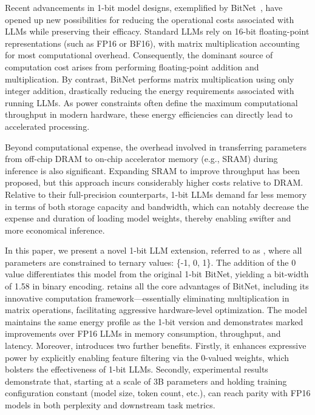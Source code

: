 Recent advancements in 1-bit model designs, exemplified by BitNet~\cite{bitnet}, have opened up new possibilities for reducing the operational costs associated with LLMs while preserving their efficacy. Standard LLMs rely on 16-bit floating-point representations (such as FP16 or BF16), with matrix multiplication accounting for most computational overhead. Consequently, the dominant source of computation cost arises from performing floating-point addition and multiplication. By contrast, BitNet performs matrix multiplication using only integer addition, drastically reducing the energy requirements associated with running LLMs. As power constraints often define the maximum computational throughput in modern hardware, these energy efficiencies can directly lead to accelerated processing.

Beyond computational expense, the overhead involved in transferring parameters from off-chip DRAM to on-chip accelerator memory (e.g., SRAM) during inference is also significant. Expanding SRAM to improve throughput has been proposed, but this approach incurs considerably higher costs relative to DRAM. Relative to their full-precision counterparts, 1-bit LLMs demand far less memory in terms of both storage capacity and bandwidth, which can notably decrease the expense and duration of loading model weights, thereby enabling swifter and more economical inference.

In this paper, we present a novel 1-bit LLM extension, referred to as \textbf{}, where all parameters are constrained to ternary values: \{-1, 0, 1\}. The addition of the 0 value differentiates this model from the original 1-bit BitNet, yielding a bit-width of 1.58 in binary encoding.  retains all the core advantages of BitNet, including its innovative computation framework—essentially eliminating multiplication in matrix operations, facilitating aggressive hardware-level optimization. The model maintains the same energy profile as the 1-bit version and demonstrates marked improvements over FP16 LLMs in memory consumption, throughput, and latency. Moreover,  introduces two further benefits. Firstly, it enhances expressive power by explicitly enabling feature filtering via the 0-valued weights, which bolsters the effectiveness of 1-bit LLMs. Secondly, experimental results demonstrate that, starting at a scale of 3B parameters and holding training configuration constant (model size, token count, etc.),  can reach parity with FP16 models in both perplexity and downstream task metrics.

